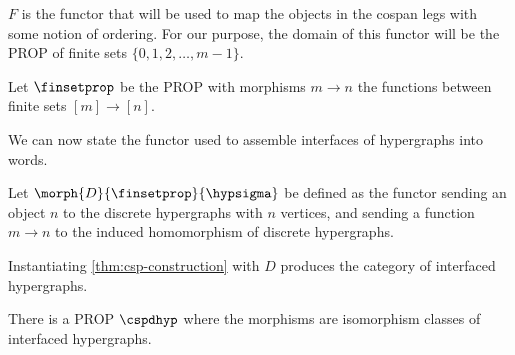 \(F\) is the functor that will be used to map the objects in the cospan legs
with some notion of ordering.
For our purpose, the domain of this functor will be the PROP of finite sets
\(\{0,1,2,\dots,m-1\}\).

\begin{definition}
    Let \(\finsetprop\) be the PROP with morphisms \(m \to n\) the functions
    between finite sets \([m] \to [n]\).
\end{definition}

We can now state the functor used to assemble interfaces of hypergraphs into
words.

\begin{definition}
    Let \(\morph{D}{\finsetprop}{\hypsigma}\) be defined as the functor sending
    an object \(n\) to the discrete hypergraphs with \(n\) vertices, and sending
    a function \(m \to n\) to the induced homomorphism of discrete
    hypergraphs.
\end{definition}

Instantiating \cref{thm:csp-construction} with \(D\) produces the category of
interfaced hypergraphs.

\begin{corollary}
    There is a PROP \(\cspdhyp\) where the morphisms are isomorphism classes of
    interfaced hypergraphs.
\end{corollary}

